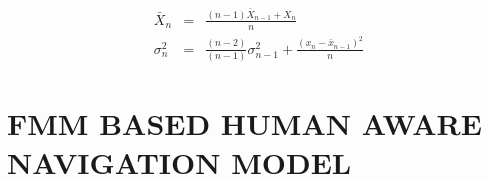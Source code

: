 \begin{eqnarray}
\bar{X}_n &=& \frac{(n-1)\bar{X}_{n-1}+X_n}{n}\\
\sigma ^2_n &=& \frac{(n-2)}{(n-1)}\sigma ^2 _{n-1}+\frac{(x_n-\bar{x}_{n-1})^2}{n}
\end{eqnarray}

\section{FMM BASED HUMAN AWARE NAVIGATION MODEL}
